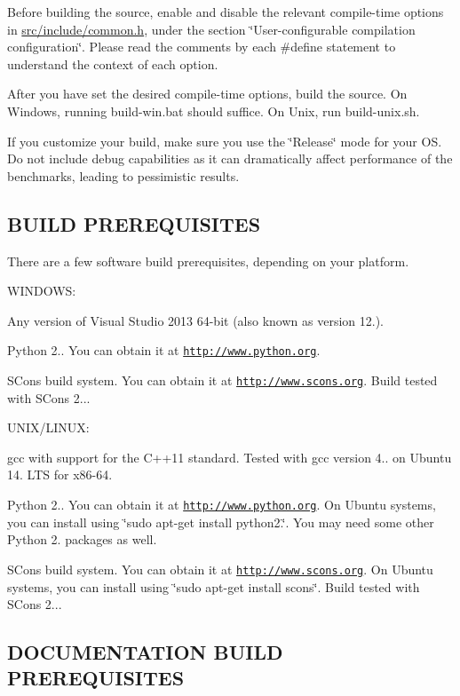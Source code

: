 Before building the source, enable and disable the relevant compile-\/time options in \hyperlink{common_8h}{src/include/common.\-h}, under the section \char`\"{}\-User-\/configurable compilation configuration\char`\"{}. Please read the comments by each \#define statement to understand the context of each option.

After you have set the desired compile-\/time options, build the source. On Windows, running build-\/win.\-bat should suffice. On Unix, run build-\/unix.\-sh.

If you customize your build, make sure you use the \char`\"{}\-Release\char`\"{} mode for your O\-S. Do not include debug capabilities as it can dramatically affect performance of the benchmarks, leading to pessimistic results. 

 \subsection*{B\-U\-I\-L\-D P\-R\-E\-R\-E\-Q\-U\-I\-S\-I\-T\-E\-S }

There are a few software build prerequisites, depending on your platform.

W\-I\-N\-D\-O\-W\-S\-:


\begin{DoxyItemize}
\item Any version of Visual Studio 2013 64-\/bit (also known as version 12.).
\item Python 2.. You can obtain it at \href{http://www.python.org}{\tt http\-://www.\-python.\-org}.
\item S\-Cons build system. You can obtain it at \href{http://www.scons.org}{\tt http\-://www.\-scons.\-org}. Build tested with S\-Cons 2...
\end{DoxyItemize}

U\-N\-I\-X/\-L\-I\-N\-U\-X\-:


\begin{DoxyItemize}
\item gcc with support for the C++11 standard. Tested with gcc version 4.. on Ubuntu 14. L\-T\-S for x86-\/64.
\item Python 2.. You can obtain it at \href{http://www.python.org}{\tt http\-://www.\-python.\-org}. On Ubuntu systems, you can install using \char`\"{}sudo apt-\/get install python2.\char`\"{}. You may need some other Python 2. packages as well.
\item S\-Cons build system. You can obtain it at \href{http://www.scons.org}{\tt http\-://www.\-scons.\-org}. On Ubuntu systems, you can install using \char`\"{}sudo apt-\/get install scons\char`\"{}. Build tested with S\-Cons 2... 

 \subsection*{D\-O\-C\-U\-M\-E\-N\-T\-A\-T\-I\-O\-N B\-U\-I\-L\-D P\-R\-E\-R\-E\-Q\-U\-I\-S\-I\-T\-E\-S }
\end{DoxyItemize}


